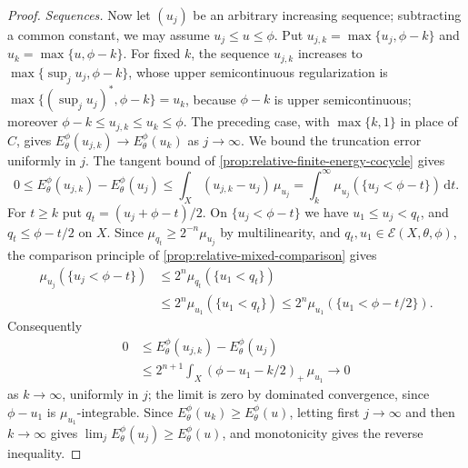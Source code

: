 \begin{proof}
\emph{Sequences.} Now let $(u_j)$ be an arbitrary increasing sequence; subtracting a common constant, we may assume $u_j\leq u\leq\phi$. Put $u_{j,k}=\max\{u_j,\phi-k\}$ and $u_k=\max\{u,\phi-k\}$. For fixed $k$, the sequence $u_{j,k}$ increases to $\max\{\sup_ju_j,\phi-k\}$, whose upper semicontinuous regularization is $\max\{(\sup_ju_j)^*,\phi-k\}=u_k$, because $\phi-k$ is upper semicontinuous; moreover $\phi-k\leq u_{j,k}\leq u_k\leq\phi$. The preceding case, with $\max\{k,1\}$ in place of $C$, gives $E_\theta^\phi(u_{j,k})\to E_\theta^\phi(u_k)$ as $j\to\infty$. We bound the truncation error uniformly in $j$. The tangent bound of \cref{prop:relative-finite-energy-cocycle} gives
\[
 0\leq E_\theta^\phi(u_{j,k})-E_\theta^\phi(u_j)
       \leq\int_X(u_{j,k}-u_j)\,\mu_{u_j}
       =\int_k^\infty\mu_{u_j}(\{u_j<\phi-t\})\,\mathrm dt.
\]
For $t\geq k$ put $q_t=(u_j+\phi-t)/2$. On $\{u_j<\phi-t\}$ we have $u_1\leq u_j<q_t$, and $q_t\leq\phi-t/2$ on $X$. Since $\mu_{q_t}\geq2^{-n}\mu_{u_j}$ by multilinearity, and $q_t,u_1\in\mathcal E(X,\theta,\phi)$, the comparison principle of \cref{prop:relative-mixed-comparison} gives
\[
 \begin{aligned}
 \mu_{u_j}(\{u_j<\phi-t\})
 &\leq2^n\mu_{q_t}(\{u_1<q_t\})\\
 &\leq2^n\mu_{u_1}(\{u_1<q_t\})
 \leq2^n\mu_{u_1}(\{u_1<\phi-t/2\}).
 \end{aligned}
\]
Consequently
\begin{equation}\label{eq:relative-energy-uniform-truncation-error}
 \begin{aligned}
 0&\leq E_\theta^\phi(u_{j,k})-E_\theta^\phi(u_j)\\
  &\leq2^{n+1}\int_X(\phi-u_1-k/2)_+\,\mu_{u_1}\longrightarrow0
 \end{aligned}
\end{equation}
as $k\to\infty$, uniformly in $j$; the limit is zero by dominated convergence, since $\phi-u_1$ is $\mu_{u_1}$-integrable. Since $E_\theta^\phi(u_k)\geq E_\theta^\phi(u)$, letting first $j\to\infty$ and then $k\to\infty$ gives $\lim_jE_\theta^\phi(u_j)\geq E_\theta^\phi(u)$, and monotonicity gives the reverse inequality.


\end{proof}
